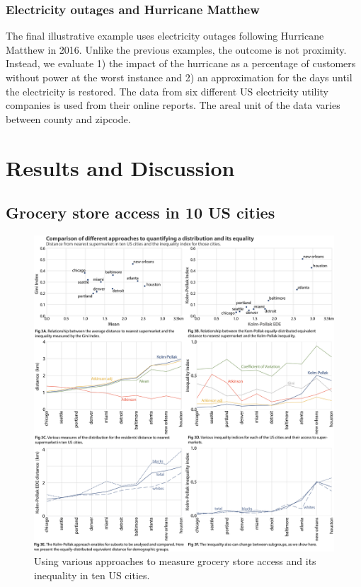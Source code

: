 \documentclass[final,3p,times,onecolumn,sort&compress]{elsarticle}
\begin{document}
\subsubsection{Electricity outages and Hurricane Matthew}
The final illustrative example uses electricity outages following Hurricane Matthew in 2016.
Unlike the previous examples, the outcome is not proximity.
Instead, we evaluate 1) the impact of the hurricane as a percentage of customers without power at the worst instance and 2) an approximation for the days until the electricity is restored.
The data from six different US electricity utility companies is used from their online reports.
The areal unit of the data varies between county and zipcode.

\section{Results and Discussion}
\subsection{Grocery store access in 10 US cities}

\begin{figure}[]
    \includegraphics[width=\linewidth]{report/fig/fig2.png}
    \caption{
    Using various approaches to measure grocery store access and its inequality in ten US cities.
    }
    \label{fig:food_deserts}
\end{figure}
\end{document}
